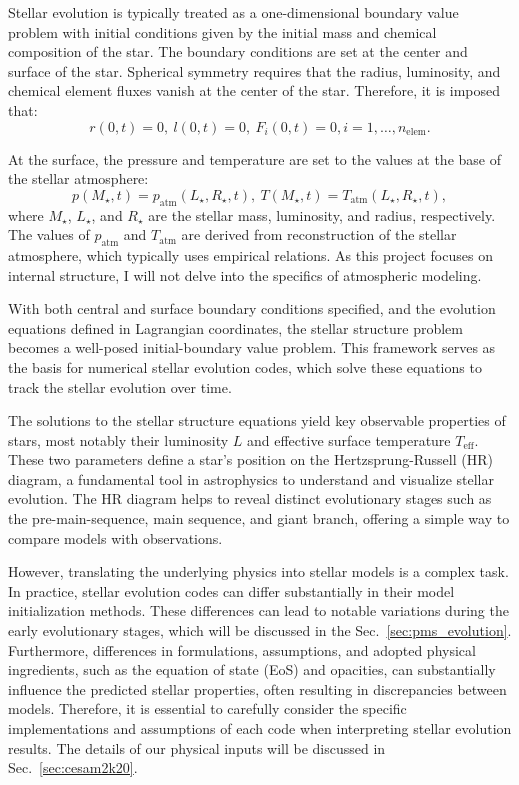 \documentclass[12pt,a4paper]{article}
\newcommand{\mr}{\mathrm}
\begin{document}
Stellar evolution is typically treated as a one-dimensional boundary value problem with initial conditions given by the initial mass and chemical composition of the star. The boundary conditions are set at the center and surface of the star. Spherical symmetry requires that the radius, luminosity, and chemical element fluxes vanish at the center of the star. Therefore, it is imposed that:
\begin{equation}
  r(0, t) = 0,\ l(0, t) = 0,\ F_i(0, t) = 0, i = 1, \ldots, n_\mr{elem}.
\end{equation}

At the surface, the pressure and temperature are set to the values at the base of the stellar atmosphere:
\begin{equation}
  p(M_\star, t) = p_\mr{atm}(L_\star, R_\star, t),\ T(M_\star, t) = T_\mr{atm}(L_\star, R_\star, t),
\end{equation}
where $M_\star$, $L_\star$, and $R_\star$ are the stellar mass, luminosity, and radius, respectively. The values of \(p_\mr{atm}\) and \(T_\mr{atm}\) are derived from reconstruction of the stellar atmosphere, which typically uses empirical relations. As this project focuses on internal structure, I will not delve into the specifics of atmospheric modeling.

With both central and surface boundary conditions specified, and the evolution equations defined in Lagrangian coordinates, the stellar structure problem becomes a well-posed initial-boundary value problem. This framework serves as the basis for numerical stellar evolution codes, which solve these equations to track the stellar evolution over time.

The solutions to the stellar structure equations yield key observable properties of stars, most notably their luminosity $L$ and effective surface temperature $T_\mr{eff}$. These two parameters define a star's position on the Hertzsprung-Russell (HR) diagram, a fundamental tool in astrophysics to understand and visualize stellar evolution. The HR diagram helps to reveal distinct evolutionary stages such as the pre-main-sequence, main sequence, and giant branch, offering a simple way to compare models with observations.

However, translating the underlying physics into stellar models is a complex task. In practice, stellar evolution codes can differ substantially in their model initialization methods. These differences can lead to notable variations during the early evolutionary stages, which will be discussed in the Sec.~\ref{sec:pms_evolution}. Furthermore, differences in formulations, assumptions, and adopted physical ingredients, such as the equation of state (EoS) and opacities, can substantially influence the predicted stellar properties, often resulting in discrepancies between models. Therefore, it is essential to carefully consider the specific implementations and assumptions of each code when interpreting stellar evolution results. The details of our physical inputs will be discussed in Sec.~\ref{sec:cesam2k20}.
\end{document}
